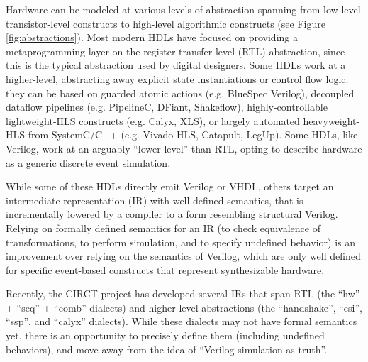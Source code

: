 \documentclass[sigplan,review,nonacm,10pt]{acmart}
\begin{document}

Hardware can be modeled at various levels of abstraction spanning from low-level transistor-level constructs to high-level algorithmic constructs (see Figure \ref{fig:abstractions}).
Most modern HDLs have focused on providing a metaprogramming layer on the register-transfer level (RTL) abstraction, since this is the typical abstraction used by digital designers.
Some HDLs work at a higher-level, abstracting away explicit state instantiations or control flow logic: they can be based on guarded atomic actions (e.g. BlueSpec Verilog\cite{bluespecverilog}), decoupled dataflow pipelines (e.g. PipelineC\cite{pipelinec}, DFiant\cite{dfiant}, Shakeflow\cite{shakeflow}), highly-controllable lightweight-HLS constructs (e.g. Calyx\cite{calyx}, XLS\cite{xls}), or largely automated heavyweight-HLS from SystemC/C++ (e.g. Vivado HLS, Catapult, LegUp\cite{legup}).
Some HDLs, like Verilog, work at an arguably ``lower-level'' than RTL, opting to describe hardware as a generic discrete event simulation.


While some of these HDLs directly emit Verilog or VHDL, others target an intermediate representation (IR) with well defined semantics, that is incrementally lowered by a compiler to a form resembling structural Verilog.
Relying on formally defined semantics for an IR (to check equivalence of transformations, to perform simulation\cite{hwsemantics}, and to specify undefined behavior) is an improvement\cite{cider} over relying on the semantics of Verilog, which are only well defined for specific event-based constructs that represent synthesizable hardware.


Recently, the CIRCT project\cite{circt} has developed several IRs that span RTL (the ``hw'' + ``seq'' + ``comb'' dialects) and higher-level abstractions (the ``handshake'', ``esi'', ``ssp'', and ``calyx''\cite{calyx} dialects).
While these dialects may not have formal semantics yet, there is an opportunity to precisely define them (including undefined behaviors), and move away from the idea of ``Verilog simulation as truth''.
\end{document}
